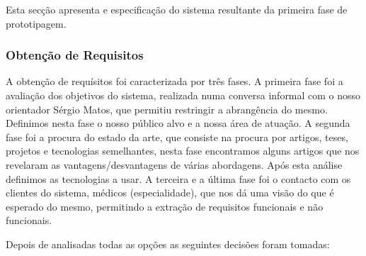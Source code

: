 \documentclass{TTUPhD}
\begin{document}
Esta secção apresenta e especificação do sistema resultante da primeira fase de prototipagem.

\subsubsection{Obtenção de Requisitos}

A obtenção de requísitos foi caracterizada por três fases.
A primeira fase foi a avaliação dos objetivos do sistema,
realizada numa conversa informal com o nosso orientador Sérgio Matos,
que permitiu restringir a abrangência do mesmo. Definimos nesta fase o nosso público alvo e a nossa área de atuação.
A segunda fase foi a procura do estado da arte, que consiste na procura por artigos, teses,
projetos e tecnologias semelhantes, nesta fase encontramos alguns artigos que nos revelaram as
vantagens/desvantagens de várias abordagens. Após esta análise definimos as tecnologias a usar.
A terceira e a última fase foi o contacto com os clientes do sistema, médicos (especialidade),
que nos dá uma visão do que é esperado do mesmo, permitindo a extração de requisitos funcionais e não funcionais.

Depois de analisadas todas as opções as seguintes decisões foram tomadas:
\end{document}
